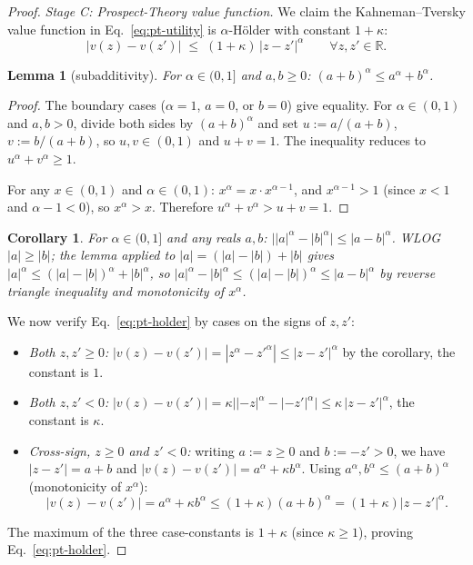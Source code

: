 \documentclass{article}
\newtheorem{lemma}{Lemma}
\newtheorem{corollary}[theorem]{Corollary}
\begin{document}
\begin{proof}
\textit{Stage C: Prospect-Theory value function.} We claim the Kahneman--Tversky value function in Eq.~\ref{eq:pt-utility} is $\alpha$-H\"older with constant $1+\kappa$:
\begin{equation}
|v(z) - v(z')| \;\leq\; (1+\kappa)\,|z - z'|^\alpha \qquad \forall z, z' \in \mathbb{R}.
\label{eq:pt-holder}
\end{equation}
\begin{lemma}[subadditivity]
For $\alpha \in (0,1]$ and $a, b \geq 0$: $(a+b)^\alpha \leq a^\alpha + b^\alpha$.
\end{lemma}

\begin{proof}
The boundary cases ($\alpha = 1$, $a=0$, or $b=0$) give equality. For $\alpha \in (0,1)$ and $a, b > 0$, divide both sides by $(a+b)^\alpha$ and set $u := a/(a+b)$, $v := b/(a+b)$, so $u, v \in (0,1)$ and $u + v = 1$. The inequality reduces to $u^\alpha + v^\alpha \geq 1$.

For any $x \in (0,1)$ and $\alpha \in (0,1)$: $x^\alpha = x \cdot x^{\alpha-1}$, and $x^{\alpha-1} > 1$ (since $x < 1$ and $\alpha - 1 < 0$), so $x^\alpha > x$. Therefore $u^\alpha + v^\alpha > u + v = 1$. 
\end{proof} 

\begin{corollary}
For $\alpha \in (0,1]$ and any reals $a, b$: $\big||a|^\alpha - |b|^\alpha\big| \leq |a-b|^\alpha$. WLOG $|a| \geq |b|$; the lemma applied to $|a| = (|a| - |b|) + |b|$ gives $|a|^\alpha \leq (|a|-|b|)^\alpha + |b|^\alpha$, so $|a|^\alpha - |b|^\alpha \leq (|a|-|b|)^\alpha \leq |a-b|^\alpha$ by reverse triangle inequality and monotonicity of $x^\alpha$.
\end{corollary}


We now verify Eq.~\ref{eq:pt-holder} by cases on the signs of $z, z'$:
\begin{itemize}
\item \emph{Both $z, z' \geq 0$:} $|v(z) - v(z')| = |z^\alpha - z'^\alpha| \leq |z-z'|^\alpha$ by the corollary, the constant is $1$.
\item \emph{Both $z, z' < 0$:} $|v(z) - v(z')| = \kappa\big||{-z}|^\alpha - |{-z'}|^\alpha\big| \leq \kappa\,|z-z'|^\alpha$, the constant is $\kappa$.
\item \emph{Cross-sign, $z \geq 0$ and $z' < 0$:} writing $a := z \geq 0$ and $b := -z' > 0$, we have $|z - z'| = a + b$ and $|v(z) - v(z')| = a^\alpha + \kappa b^\alpha$. Using $a^\alpha, b^\alpha \leq (a+b)^\alpha$ (monotonicity of $x^\alpha$):
\begin{equation*}
|v(z) - v(z')| = a^\alpha + \kappa b^\alpha \leq (1 + \kappa)(a+b)^\alpha = (1 + \kappa)|z-z'|^\alpha.
\end{equation*}
\end{itemize}
The maximum of the three case-constants is $1 + \kappa$ (since $\kappa \geq 1$), proving Eq.~\ref{eq:pt-holder}.


\end{proof}
\end{document}
